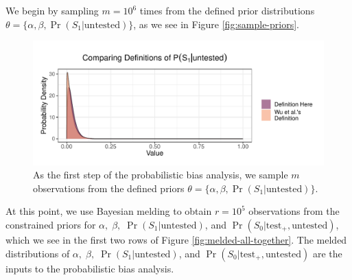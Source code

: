 \documentclass[12pt,twoside]{smiththesis}
\begin{document}
We begin by sampling \(m=10^6\) times from the defined prior distributions \(\theta = \Big\{ \alpha, \beta, \Pr(S_1| \text{untested})\Big\}\), as we see in Figure \ref{fig:sample-priors}.
\begin{figure}
\includegraphics[width=1\linewidth]{thesis_files/figure-latex/unnamed-chunk-55-1} \caption{\label{fig:sample-priors}As the first step of the probabilistic bias analysis, we sample $m$ observations from the defined priors  $\theta = \{ \alpha, \beta, \Pr(S_1| \text{untested})\}$.}\label{fig:unnamed-chunk-55}
\end{figure}
At this point, we use Bayesian melding to obtain \(r=10^5\) observations from the constrained priors for \(\alpha, \; \beta, \;\Pr(S_1|\text{untested})\), and \(\Pr(S_0|\text{test}_+,\text{untested})\), which we see in the first two rows of Figure \ref{fig:melded-all-together}. The melded distributions of \(\alpha, \; \beta, \;\Pr(S_1|\text{untested})\), and \(\Pr(S_0|\text{test}_+,\text{untested})\) are the inputs to the probabilistic bias analysis.
\end{document}
